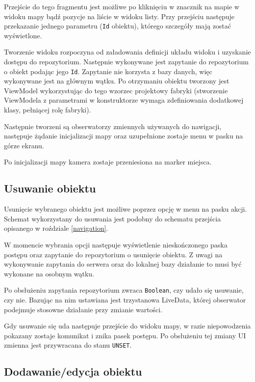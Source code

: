 \documentclass[polish,polish,a4paper,12pt]{article}
\begin{document}
	Przejście do tego fragmentu jest możliwe po kliknięciu w znacznik na mapie w widoku mapy bądź pozycje na liście w widoku listy. Przy przejściu następuje przekazanie jednego parametru (\texttt{Id} obiektu), którego szczegóły mają zostać wyświetlone.

	Tworzenie widoku rozpoczyna od załadowania definicji układu widoku i uzyskanie dostępu do repozytorium. Następnie wykonywane jest zapytanie do repozytorium o obiekt podając jego \texttt{Id}. Zapytanie nie korzysta z bazy danych, więc wykonywane jest na głównym wątku. Po otrzymaniu obiektu tworzony jest ViewModel wykorzystując do tego wzorzec projektowy fabryki (stworzenie ViewModela z parametrami w konstruktorze wymaga zdefiniowania dodatkowej klasy, pełniącej rolę fabryki).

	Następnie tworzeni są obserwatorzy zmiennych używanych do nawigacji, następuje żądanie inicjalizacji mapy oraz uzupełnione zostaje menu w pasku na górze ekranu.

	Po inicjalizacji mapy kamera zostaje przeniesiona na marker miejsca.

	\subsection{Usuwanie obiektu}

	Usunięcie wybranego obiektu jest możliwe poprzez opcję w menu na pasku akcji. Schemat wykorzystany do usuwania jest podobny do schematu przejścia opisanego w roździale \ref{navigation}.

	W momencie wybrania opcji następuje wyświetlenie nieskończonego paska postępu oraz zapytanie do repozytorium o usunięcie obiektu. Z uwagi na wykonywanie zapytania do serwera oraz do lokalnej bazy działanie to musi być wykonane na osobnym wątku.

	Po obsłużeniu zapytania repozytorium zwraca \texttt{Boolean}, czy udało się usuwanie, czy nie. Bazując na nim ustawiana jest trzystanowa LiveData, której obserwator podejmuje stosowne działanie przy zmianie wartości.

	Gdy usuwanie się uda następuje przejście do widoku mapy, w razie niepowodzenia pokazany zostaje komunikat i znika pasek postępu. Po obsłużeniu tej zmiany UI zmienna jest przywracana do stanu \texttt{UNSET}.

	\subsection{Dodawanie/edycja obiektu}
\end{document}
